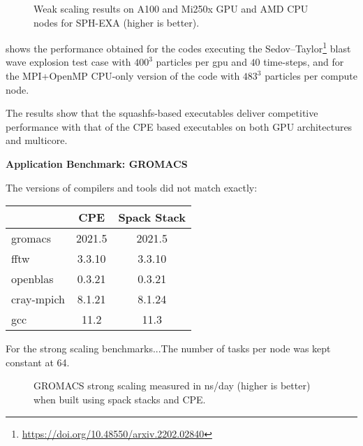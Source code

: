 \begin{figure}[htp!]
    \begin{center}
        
        
        
    \end{center}
    \caption{Weak scaling results on A100 and Mi250x GPU and AMD CPU nodes for SPH-EXA (higher is better).}
    \label{fig:sph-weak}
\end{figure}

 shows the performance obtained for the codes executing the Sedov--Taylor\footnote{\url{https://doi.org/10.48550/arxiv.2202.02840}} blast wave explosion test case with $400^3$ particles per gpu and $40$ time-steps, and for the MPI+OpenMP CPU-only version of the code with $483^3$ particles per compute node.

The results show that the squashfs-based executables deliver competitive performance with that of the CPE based executables on both GPU architectures and multicore.

\noindent\textbf{Application Benchmark: GROMACS}

The versions of compilers and tools did not match exactly:
\begin{center}
    \begin{tabular}{l |c  c }
                      & CPE   & Spack Stack \\
          \hline
        gromacs       & 2021.5   & 2021.5   \\
        fftw          & 3.3.10   & 3.3.10   \\
        openblas      & 0.3.21   & 0.3.21   \\
        cray-mpich    & 8.1.21   & 8.1.24   \\
        gcc           & 11.2     & 11.3     \\
    \end{tabular}
\end{center}

For the strong scaling benchmarks...The number of tasks per node was kept constant at 64. 

\begin{figure}[htp!]
    \begin{center}
        
    \end{center}
    \caption{GROMACS strong scaling measured in ns/day (higher is better) when built using spack stacks and CPE.}
    \label{fig:gromacs-strong}
\end{figure}

